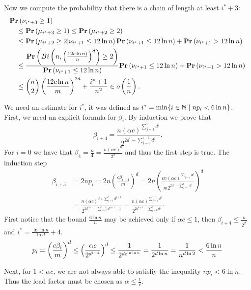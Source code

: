 Now we compute the probability that there is a chain of length at least $i^* + 3$:
\[
\begin{split}
& \mathbf{Pr}\left(\nu_{i^* + 3} \geq 1\right) \\
	& \quad \leq \mathbf{Pr}\left(\mu_{i^* + 3} \geq 1\right) \leq \mathbf{Pr}\left(\mu_{i^* + 2} \geq 2\right) \\
	& \quad \leq \mathbf{Pr}\left(\mu_{i^* + 2} \geq 2 | \nu_{i^* + 1} \leq 12 \ln n\right)\mathbf{Pr}\left(\nu_{i^* + 1} \leq 12 \ln n\right) + \mathbf{Pr}\left(\nu_{i^* + 1} > 12 \ln n\right) \\	& \quad \leq \frac{\mathbf{Pr}\left(Bi\left(n, \left(\frac{12 c \ln n)}{n}\right) ^ d\right) \geq 2\right)}{\mathbf{Pr}\left(\nu_{i^* + 1} \leq 12 \ln n\right)}\mathbf{Pr}\left(\nu_{i^* + 1} \leq 12 \ln n\right) + \mathbf{Pr}\left(\nu_{i^* + 1} > 12 \ln n\right) \\
	& \quad \leq \binom{n}{2} \left(\frac{12 c \ln n}{m}\right) ^ {2d} + \frac{i^* + 1}{n ^ 2} \in o\left(\frac{1}{n}\right) \textit{.}
\end{split}
\]

We need an estimate for $i^*$, it was defined as $i^* = \displaystyle\min \{i \in \mathbb{N} \mid np_i < 6 \ln n\}$. First, we need an explicit formula for $\beta_i$. By induction we prove that $$\beta_{i + 4} = \frac{n \left(\alpha c\right) ^ {\sum_{j = 1}^{i}d ^ j}}{2 ^ {2 d ^ i - \sum_{j = 0}^{i - 1}{d ^ j}}} \textit{.}$$
For $i = 0$ we have that $\beta_4 = \frac{n}{4} = \frac{n\left(\alpha c\right) ^ 0}{2 ^ {2}}$ and thus the first step is true. The induction step
\[
\begin{split}
\beta_{i + 5} 
	& = 2np_i = 2n \left(\frac{c\beta_{i + 4}}{m}\right) ^ d = 2n \left(\frac{cn\left(\alpha c\right) ^ {\sum_{j = 1}^{i}d ^ j}}{m 2 ^ {2 d ^ i - \sum_{j = 1}^{i}d^j}}\right) ^ d \\
	& = \frac{n\left(\alpha c\right) ^ {d + \sum_{j = 1}^{i} d ^ {j + 1}}}{2 ^ {2d ^ {i + 1} - \sum_{j = 0}^{i  -1} d ^ {j + 1} - 1}} = \frac{n \left(\alpha c\right) ^ {\sum_{j = 1}^{i + 1} d ^ j}}{2 ^ {2d ^ {i + 1} - \sum_{j = 0}^{i} d ^ j}} \textit{.}
\end{split}
\]
First notice that the bound $\frac{6 \ln n}{n}$ may be achieved only if $\alpha c \leq 1$, then $\beta_{i + 4} \leq \frac{n}{2 ^ {d ^ i}}$ and $i^* = \frac{\ln \ln n}{\ln d} + 4$.
\[
p_i = \left(\frac{c\beta_i}{m}\right) ^ d \leq \left(\frac{\alpha c}{2 ^ {d ^ {i - 4}}}\right) ^ d \leq \frac{1}{2 ^ {de^{\ln \ln n}}} = \frac{1}{2 ^ {d \ln n}} = \frac{1}{n ^ {d \ln 2}} < \frac{6 \ln n}{n}\\
\]

Next, for $1 < \alpha c$, we are not always able to satisfiy the inequality $np_i < 6 \ln n$. Thus the load factor must be chosen as $\alpha \leq \frac{1}{c}$.

